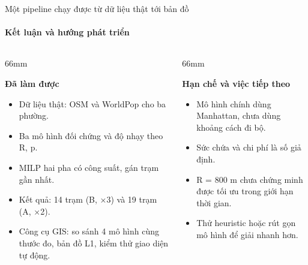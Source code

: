\documentclass[aspectratio=169, 10pt, t, xcolor=table]{beamer}
\newcommand{\Flead}{\fontsize{8}{11}\selectfont}
\newcommand{\slidefoot}{}
\newcommand{\sfoot}[1]{\gdef\slidefoot{#1}}
\newenvironment{bul}[1][1.3mm]{\begin{itemize}\setlength{\itemsep}{#1}}{\end{itemize}}
\begin{document}
\sfoot{Nhóm 18 · Cảm ơn cô và các bạn đã lắng nghe}
\begin{frame}{Một pipeline chạy được từ dữ liệu thật tới bản đồ}
  \framesubtitle{Kết luận và hướng phát triển}
  \vspace{2mm}
  \begin{columns}[T, onlytextwidth]
    \begin{column}{66mm}
      {\fontsize{9.5}{11.5}\selectfont\bfseries\color{accent}Đã làm được\par}\vspace{2mm}
      \Flead\color{soft}
      \begin{bul}[1.8mm]
        \item Dữ liệu thật: OSM và WorldPop cho ba phường.
        \item Ba mô hình đối chứng và độ nhạy theo R, p.
        \item MILP hai pha có công suất, gán trạm gần nhất.
        \item Kết quả: 14 trạm (B, ×3) và 19 trạm (A, ×2).
        \item Công cụ GIS: so sánh 4 mô hình cùng thước đo, bản đồ L1, kiểm thử giao diện tự động.
      \end{bul}
    \end{column}
    \begin{column}{66mm}
      {\fontsize{9.5}{11.5}\selectfont\bfseries\color{accent}Hạn chế và việc tiếp theo\par}\vspace{2mm}
      \Flead\color{soft}
      \begin{bul}[1.8mm]
        \item Mô hình chính dùng Manhattan, chưa dùng khoảng cách đi bộ.
        \item Sức chứa và chi phí là số giả định.
        \item R = 800 m chưa chứng minh được tối ưu trong giới hạn thời gian.
        \item Thử heuristic hoặc rút gọn mô hình để giải nhanh hơn.
      \end{bul}
    \end{column}
  \end{columns}
\end{frame}
\end{document}
